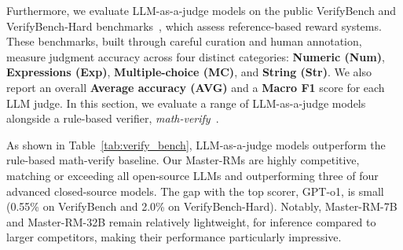 

Furthermore, we evaluate LLM-as-a-judge models on the public VerifyBench and VerifyBench-Hard benchmarks~\citep{yan2025verifybench}, which assess reference-based reward systems. These benchmarks, built through careful curation and human annotation, measure judgment accuracy across four distinct categories: \textbf{Numeric (Num)}, \textbf{Expressions (Exp)}, \textbf{Multiple-choice (MC)}, and \textbf{String (Str)}. We also report an overall \textbf{Average accuracy (AVG)} and a \textbf{Macro F1} score for each LLM judge.
In this section, we evaluate a range of LLM-as-a-judge models alongside a rule-based verifier, \emph{math-verify}~\citep{kydlivcekmath}.


As shown in Table~\ref{tab:verify_bench}, LLM-as-a-judge models outperform the rule-based math-verify baseline. Our Master-RMs are highly competitive, matching or exceeding all open-source LLMs and outperforming three of four advanced closed-source models. The gap with the top scorer, GPT-o1, is small (0.55\% on VerifyBench and 2.0\% on VerifyBench-Hard). Notably, Master-RM-7B and Master-RM-32B remain relatively lightweight, for inference compared to larger competitors, making their performance particularly impressive.



